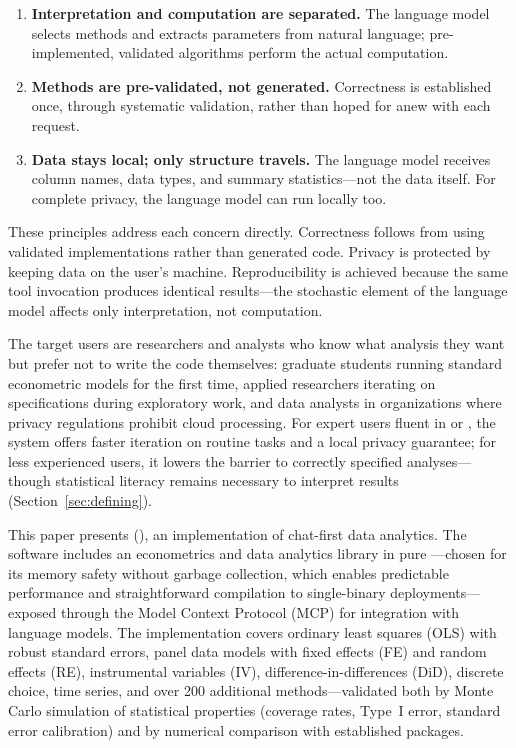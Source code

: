 \begin{enumerate}
  \item \textbf{Interpretation and computation are separated.}
    The language model selects methods and extracts parameters from natural
    language; pre-implemented, validated algorithms perform the actual
    computation.
  \item \textbf{Methods are pre-validated, not generated.}
    Correctness is established once, through systematic validation,
    rather than hoped for anew with each request.
  \item \textbf{Data stays local; only structure travels.}
    The language model receives column names, data types, and summary
    statistics---not the data itself. For complete privacy, the language
    model can run locally too.
\end{enumerate}

These principles address each concern directly. Correctness follows
from using validated implementations rather than generated code.
Privacy is protected by keeping data on the user's machine.
Reproducibility is achieved because the same tool invocation produces
identical results---the stochastic element of the language model
affects only interpretation, not computation.

The target users are researchers and analysts who know what analysis
they want but prefer not to write the code themselves: graduate
students running standard econometric models for the first time,
applied researchers iterating on specifications during exploratory
work, and data analysts in organizations where privacy regulations
prohibit cloud processing. For expert users fluent in 
or , the system offers faster iteration on routine
tasks and a local privacy guarantee; for less experienced users, it
lowers the barrier to correctly specified analyses---though
statistical literacy remains necessary to interpret results
(Section~\ref{sec:defining}).

This paper presents  (), an implementation of
chat-first data analytics. The software includes an econometrics and
data analytics library in pure ---chosen for its
memory safety without garbage collection, which enables predictable
performance and straightforward compilation to single-binary
deployments---exposed through the
Model Context Protocol (MCP) for integration with language models. The
implementation covers ordinary least squares (OLS) with robust standard errors,
panel data models with fixed effects (FE) and random effects (RE),
instrumental variables (IV), difference-in-differences (DiD),
discrete choice, time series, and over 200 additional methods---validated
both by Monte Carlo simulation of statistical properties (coverage rates,
Type~I error, standard error calibration) and by numerical comparison with
established  packages.

